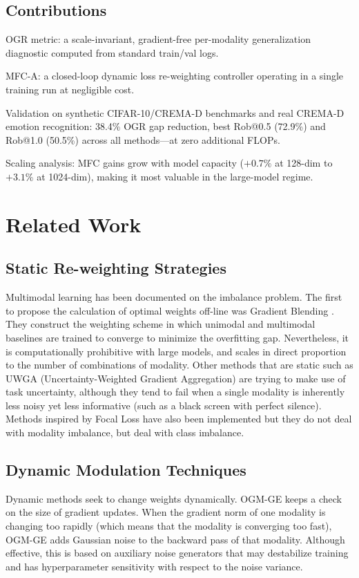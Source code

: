 \documentclass[fleqn,10pt]{wlscirep}
\begin{document}
\subsection*{Contributions}
OGR metric: a scale-invariant, gradient-free per-modality generalization diagnostic computed from standard train/val logs.

MFC-A: a closed-loop dynamic loss re-weighting controller operating in a single training run at negligible cost.

Validation on synthetic CIFAR-10/CREMA-D benchmarks and real CREMA-D emotion recognition: 38.4\% OGR gap reduction, best Rob@0.5 (72.9\%) and Rob@1.0 (50.5\%) across all methods---at zero additional FLOPs.

Scaling analysis: MFC gains grow with model capacity ($+0.7\%$ at 128-dim to $+3.1\%$ at 1024-dim), making it most valuable in the large-model regime.

\section{Related Work}

\subsection{Static Re-weighting Strategies}
Multimodal learning has been documented on the imbalance problem. The first to propose the calculation of optimal weights off-line was Gradient Blending \cite{wang2020makes}. They construct the weighting scheme in which unimodal and multimodal baselines are trained to converge to minimize the overfitting gap. Nevertheless, it is computationally prohibitive with large models, and scales in direct proportion to the number of combinations of modality. Other methods that are static such as UWGA (Uncertainty-Weighted Gradient Aggregation) \cite{kendall2018multi} are trying to make use of task uncertainty, although they tend to fail when a single modality is inherently less noisy yet less informative (such as a black screen with perfect silence). Methods inspired by Focal Loss \cite{lin2017focal} have also been implemented but they do not deal with modality imbalance, but deal with class imbalance.

\subsection{Dynamic Modulation Techniques}
Dynamic methods seek to change weights dynamically. OGM-GE \cite{peng2022balanced} keeps a check on the size of gradient updates. When the gradient norm of one modality is changing too rapidly (which means that the modality is converging too fast), OGM-GE adds Gaussian noise to the backward pass of that modality. Although effective, this is based on auxiliary noise generators that may destabilize training and has hyperparameter sensitivity with respect to the noise variance.
\end{document}
